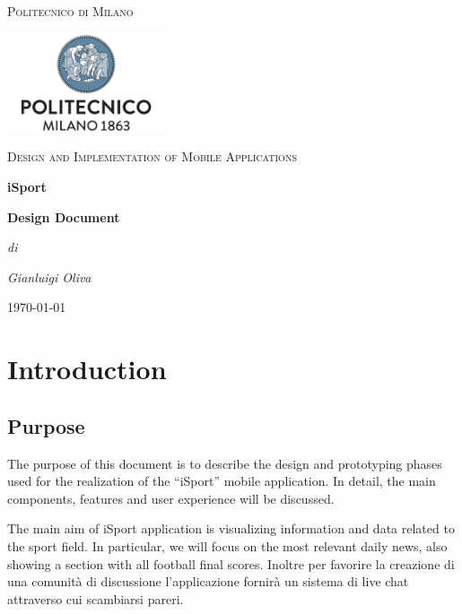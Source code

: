 \documentclass[numbers=noenddot, 12pt, a4paper, oneside]{scrbook}
\begin{document}
\begin{titlepage}
	\centering
	{\scshape\LARGE Politecnico di Milano \par}
	\vspace{1cm}
	\includegraphics[width=0.35\textwidth]{polimi-logo}\par
	\vspace{1cm}

	{\scshape\Large Design and Implementation of Mobile Applications\par}
	\vspace{1.5cm}
	{\huge\bfseries iSport \par}
	\vspace{1cm}
	{\Large\bfseries Design Document \par}
	\vspace{3cm}
	{\Large\itshape di\par}
	{\Large\itshape Gianluigi Oliva\par}
	\vspace{1.5cm}
	\vfill
	


	\vfill

	{\large \today\par}
\end{titlepage}

\newpage
\tableofcontents
\newpage


\chapter{Introduction}

\section{Purpose}
The purpose of this document is to describe the design and prototyping phases used for the realization of the “iSport” mobile application. In detail, the main components, features and user experience will be discussed.

The main aim of iSport application is visualizing information and data related to the sport field. In particular, we will focus on the most relevant daily news, also showing a section with all football final scores. Inoltre per favorire la creazione di una comunità di discussione l'applicazione fornirà un sistema di live chat attraverso cui scambiarsi pareri.
\end{document}
